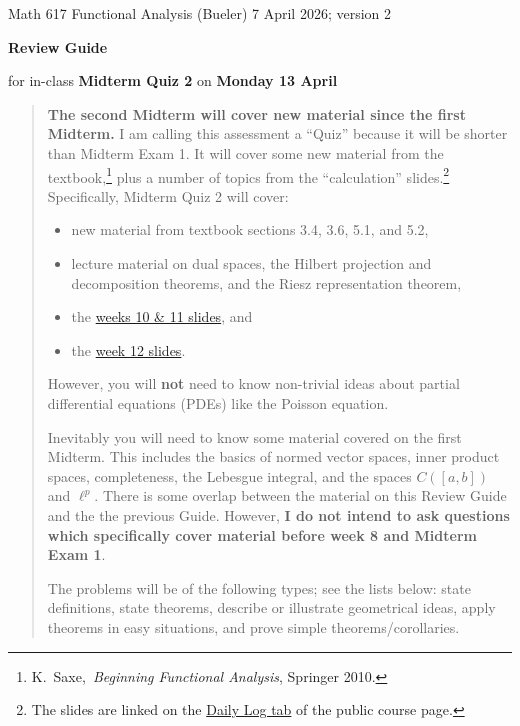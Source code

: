 \documentclass[12pt]{amsart}
\newcommand{\textbook}{K.~Saxe,~\emph{Beginning Functional Analysis}, Springer 2010.}
\begin{document}
\scriptsize \noindent Math 617 Functional Analysis (Bueler) \hfill 7 April 2026; {\color{red} version 2}
\thispagestyle{empty}

\bigskip
\LARGE\centerline{\textbf{Review Guide}}

\medskip
\Large\centerline{for in-class \textbf{Midterm Quiz 2} on \textbf{Monday 13 April}}

\normalsize
\bigskip
\begin{quote}
\textbf{The second Midterm will cover new material since the first Midterm.}  I am calling this assessment a ``Quiz'' because it will be shorter than Midterm Exam 1.  It will cover some new material from the textbook,\footnote{\textbook} plus a number of topics from the ``calculation'' slides.\footnote{The slides are linked on the \href{https://bueler.github.io/fa/daily.html}{Daily Log tab} of the public course page.}  Specifically, Midterm Quiz 2 will cover:
\begin{itemize}
\item new material from textbook sections 3.4, 3.6, 5.1, and 5.2,
\item lecture material on dual spaces, the Hilbert projection and decomposition theorems, and the Riesz representation theorem,
\item the \href{https://bueler.github.io/fa/assets/slides/S26/week10.pdf}{weeks 10 \& 11 slides}, and
\item the \href{https://bueler.github.io/fa/assets/slides/S26/week12.pdf}{week 12 slides}.
\end{itemize}
However, you will \textbf{not} need to know non-trivial ideas about partial differential equations (PDEs) like the Poisson equation.

\medskip \noindent Inevitably you will need to know some material covered on the first Midterm.  This includes the basics of normed vector spaces, inner product spaces, completeness, the Lebesgue integral, and the spaces $C([a,b])$ and $\ell^p$.  There is some overlap between the material on this Review Guide and the the previous Guide.  However, \textbf{I do not intend to ask questions which specifically cover material before week 8 and Midterm Exam 1}.

\medskip \noindent The problems will be of the following types; see the lists below: state definitions, state theorems, describe or illustrate geometrical ideas, apply theorems in easy situations, and prove simple theorems/corollaries.
\end{quote}
\bigskip
\end{document}
